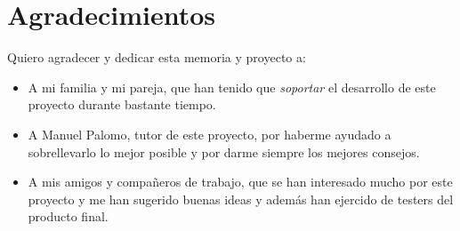\section*{Agradecimientos}
Quiero agradecer y dedicar esta memoria y proyecto a:

\begin{itemize}
\item A mi familia y mi pareja, que han tenido que
  \textit{soportar} el desarrollo de este proyecto durante bastante tiempo.

\item A Manuel Palomo, tutor de este proyecto, por haberme ayudado a
  sobrellevarlo lo mejor posible y por darme siempre los mejores consejos.
  
\item A mis amigos y compañeros de trabajo, que se han interesado mucho por
  este proyecto y me han sugerido buenas ideas y además han ejercido
  de testers del producto final.
 
\end{itemize}

